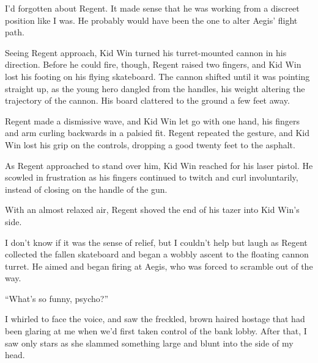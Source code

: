 I'd forgotten about Regent.  It made sense that he was working from a discreet position like I was.  He probably would have been the one to alter Aegis' flight path.



Seeing Regent approach, Kid Win turned his turret-mounted cannon in his direction.  Before he could fire, though, Regent raised two fingers, and Kid Win lost his footing on his flying skateboard.  The cannon shifted until it was pointing straight up, as the young hero dangled from the handles, his weight altering the trajectory of the cannon.  His board clattered to the ground a few feet away.



Regent made a dismissive wave, and Kid Win let go with one hand, his fingers and arm curling backwards in a palsied fit.  Regent repeated the gesture, and Kid Win lost his grip on the controls, dropping a good twenty feet to the asphalt.



As Regent approached to stand over him, Kid Win reached for his laser pistol.  He scowled in frustration as his fingers continued to twitch and curl involuntarily, instead of closing on the handle of the gun.



With an almost relaxed air, Regent shoved the end of his tazer into Kid Win's side.



I don't know if it was the sense of relief, but I couldn't help but laugh as Regent collected the fallen skateboard and began a wobbly ascent to the floating cannon turret.  He aimed and began firing at Aegis, who was forced to scramble out of the way.



``What's so funny, psycho?''



I whirled to face the voice, and saw the freckled, brown haired hostage that had been glaring at me when we'd first taken control of the bank lobby.  After that, I saw only stars as she slammed something large and blunt into the side of my head.

















